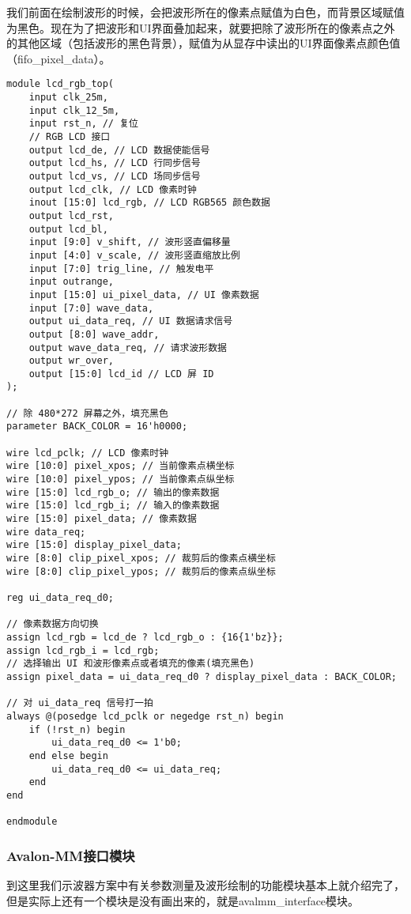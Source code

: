 \documentclass[lang=cn,a4paper,newtx]{elegantpaper}
\begin{document}
我们前面在绘制波形的时候，会把波形所在的像素点赋值为白色，而背景区域赋值为黑色。现在为了把波形和UI界面叠加起来，就要把除了波形所在的像素点之外的其他区域（包括波形的黑色背景），赋值为从显存中读出的UI界面像素点颜色值（fifo\_pixel\_data）。
\begin{lstlisting}
module lcd_rgb_top(
    input clk_25m,
    input clk_12_5m,
    input rst_n, // 复位
    // RGB LCD 接口
    output lcd_de, // LCD 数据使能信号
    output lcd_hs, // LCD 行同步信号
    output lcd_vs, // LCD 场同步信号
    output lcd_clk, // LCD 像素时钟
    inout [15:0] lcd_rgb, // LCD RGB565 颜色数据
    output lcd_rst,
    output lcd_bl,
    input [9:0] v_shift, // 波形竖直偏移量
    input [4:0] v_scale, // 波形竖直缩放比例
    input [7:0] trig_line, // 触发电平
    input outrange,
    input [15:0] ui_pixel_data, // UI 像素数据
    input [7:0] wave_data,
    output ui_data_req, // UI 数据请求信号
    output [8:0] wave_addr,
    output wave_data_req, // 请求波形数据
    output wr_over,
    output [15:0] lcd_id // LCD 屏 ID
);

// 除 480*272 屏幕之外，填充黑色
parameter BACK_COLOR = 16'h0000;

wire lcd_pclk; // LCD 像素时钟
wire [10:0] pixel_xpos; // 当前像素点横坐标
wire [10:0] pixel_ypos; // 当前像素点纵坐标
wire [15:0] lcd_rgb_o; // 输出的像素数据
wire [15:0] lcd_rgb_i; // 输入的像素数据
wire [15:0] pixel_data; // 像素数据
wire data_req;
wire [15:0] display_pixel_data;
wire [8:0] clip_pixel_xpos; // 裁剪后的像素点横坐标
wire [8:0] clip_pixel_ypos; // 裁剪后的像素点纵坐标

reg ui_data_req_d0;

// 像素数据方向切换
assign lcd_rgb = lcd_de ? lcd_rgb_o : {16{1'bz}};
assign lcd_rgb_i = lcd_rgb;
// 选择输出 UI 和波形像素点或者填充的像素(填充黑色)
assign pixel_data = ui_data_req_d0 ? display_pixel_data : BACK_COLOR;

// 对 ui_data_req 信号打一拍
always @(posedge lcd_pclk or negedge rst_n) begin
    if (!rst_n) begin
        ui_data_req_d0 <= 1'b0;
    end else begin
        ui_data_req_d0 <= ui_data_req;
    end
end

endmodule

\end{lstlisting}
\subsubsection{Avalon-MM接口模块}
到这里我们示波器方案中有关参数测量及波形绘制的功能模块基本上就介绍完了，但是实际上还有一个模块是没有画出来的，就是avalmm\_interface模块。
\end{document}

